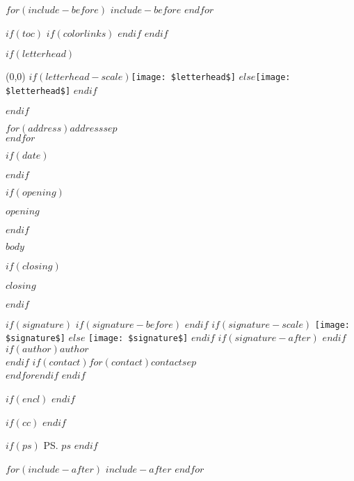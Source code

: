 \documentclass[$if(font-size)$$fontsize$$else$11pt$endif$]{letter}
\begin{document}
	$for(include-before)$
	$include-before$
	$endfor$

	$if(toc)$
	{
	$if(colorlinks)$
	\hypersetup{linkcolor=$if(toccolor)$$toccolor$$else$black$endif$}
	$endif$
	\setcounter{tocdepth}{$toc-depth$}
	\tableofcontents
	}
	$endif$

	$if(letterhead)$
	\begin{textblock}{0}(0,0)
		$if(letterhead-scale)$\texttt{[image: \$letterhead\$]}
		$else$\texttt{[image: \$letterhead\$]}
		$endif$
	\end{textblock}
	$endif$

\begin{letter}{$for(address)$$address$$sep$\\$endfor$}

	$if(date)$
		\date{$date$}
	$endif$

	$if(opening)$
		\opening{$opening$}
	$endif$

	$body$

	$if(closing)$
		\closing{$closing$}
	$endif$

	$if(signature)$
		$if(signature-before)$
			\vspace*{$signature-before$}
		$endif$
		$if(signature-scale)$
			\texttt{[image: \$signature\$]}
		$else$
			\texttt{[image: \$signature\$]}
		$endif$
		$if(signature-after)$
			\vspace*{$signature-after$}
		$endif$
		$if(author)$$author$\\$endif$
		$if(contact)$$for(contact)$$contact$$sep$\\$endfor$$endif$
	$endif$

	$if(encl)$
	$endif$

	$if(cc)$
	$endif$

	$if(ps)$
		\ps{$ps$}
	$endif$

\end{letter}

$for(include-after)$
$include-after$
$endfor$
\end{document}

